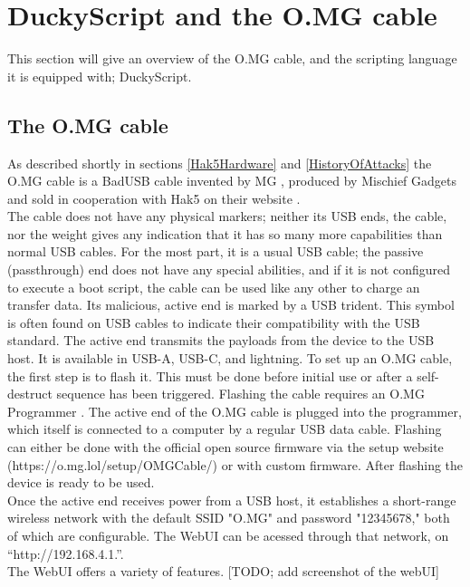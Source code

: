 \section{DuckyScript and the O.MG cable}


This section will give an overview of the O.MG cable, and the scripting language it is equipped with; DuckyScript. 

\subsection{The O.MG cable} \label{theOMGCable}

As described shortly in sections \ref{Hak5Hardware} and \ref{HistoryOfAttacks} the O.MG cable is a BadUSB cable invented by MG \cite{MGCable2019a}, produced by Mischief Gadgets \cite{hak5MischiefGadgets} and sold in cooperation with Hak5 on their website \cite{hak5MischiefGadgets}. \\
The cable does not have any physical markers; neither its USB ends, the cable, nor the weight gives any indication that it has so many more capabilities than normal USB cables. For the most part, it is a usual USB cable; the passive (passthrough) end does not have any special abilities, and if it is not configured to execute a boot script, the cable can be used like any other to charge an transfer data. Its malicious, active end is marked by a USB trident. This symbol is often found on USB cables to indicate their compatibility with the USB standard. The active end transmits the payloads from the device to the USB host. It is available in USB-A, USB-C, and lightning. 
To set up an O.MG cable, the first step is to flash it. This must be done before initial use or after a self-destruct sequence has been triggered. Flashing the cable requires an O.MG Programmer \cite{hak5MGCable}. The active end of the O.MG cable is plugged into the programmer, which itself is connected to a computer by a regular USB data cable. Flashing can either be done with the official open source firmware \cite{DuckyScriptSyntaxGuide} via the setup website (https://o.mg.lol/setup/OMGCable/) or with custom firmware. After flashing the device is ready to be used. \\  
Once the active end receives power from a USB host, it establishes a short-range wireless network with the default SSID "O.MG" and password "12345678," both of which are configurable. The WebUI can be acessed through that network, on ``http://192.168.4.1.''. \\
The WebUI offers a variety of features.
[TODO; add screenshot of the webUI]

